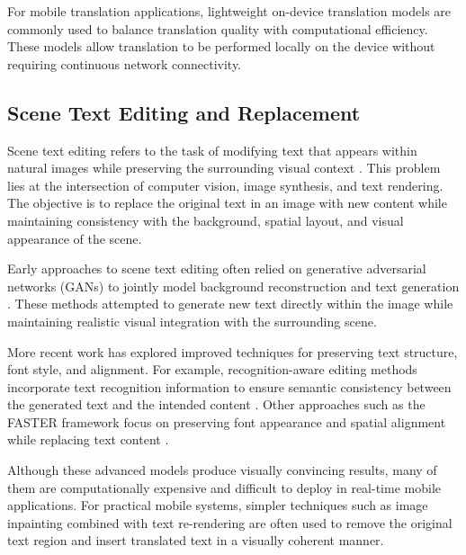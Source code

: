 For mobile translation applications, lightweight on-device translation models are commonly used to balance translation quality with computational efficiency. These models allow translation to be performed locally on the device without requiring continuous network connectivity.

\subsection{Scene Text Editing and Replacement}

Scene text editing refers to the task of modifying text that appears within natural images while preserving the surrounding visual context \cite{wu2019editing}. This problem lies at the intersection of computer vision, image synthesis, and text rendering. The objective is to replace the original text in an image with new content while maintaining consistency with the background, spatial layout, and visual appearance of the scene.

Early approaches to scene text editing often relied on generative adversarial networks (GANs) to jointly model background reconstruction and text generation \cite{wu2019editing}. These methods attempted to generate new text directly within the image while maintaining realistic visual integration with the surrounding scene.

More recent work has explored improved techniques for preserving text structure, font style, and alignment. For example, recognition-aware editing methods incorporate text recognition information to ensure semantic consistency between the generated text and the intended content \cite{fang2025rsste}. Other approaches such as the FASTER framework focus on preserving font appearance and spatial alignment while replacing text content \cite{das2025faster}.

Although these advanced models produce visually convincing results, many of them are computationally expensive and difficult to deploy in real-time mobile applications. For practical mobile systems, simpler techniques such as image inpainting combined with text re-rendering are often used to remove the original text region and insert translated text in a visually coherent manner.